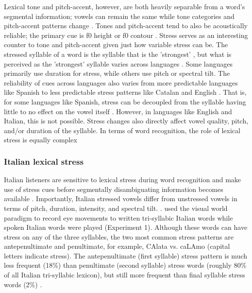 Lexical tone and pitch-accent, however, are both heavily separable from a word's segmental information; vowels can remain the same while tone categories and pitch-accent patterns change \citep{Zeng2017}. Tones and pitch-accent tend to also be acoustically reliable; the primary cue is f0 height or f0 contour \citep{goss_2014}.  Stress serves as an interesting counter to tone and pitch-accent given just how variable stress can be. The stressed syllable of a word is the syllable that is the 'strongest' \citep{sluijter1996spectral}, but what is perceived as the 'strongest' syllable varies across languages \citep{Cutler1988}. Some languages primarily use duration for stress, while others use pitch or spectral tilt. The reliability of cues across languages also varies from more predictable languages like Spanish to less predictable stress patterns like Catalan and English \citep{ortega_2011, beckman_1994}. That is, for some languages like Spanish, stress can be decoupled from the syllable having little to no effect on the vowel itself \citep{ortega_2011}. However, in languages like English and Italian, this is not possible. Stress changes also directly affect vowel quality, pitch, and/or duration of the syllable. In terms of word recognition, the role of lexical stress is equally complex \citep{cutler2001voornaam, Reinisch2010}

\subsubsection{Italian lexical stress}
Italian listeners are sensitive to lexical stress during word recognition and make use of stress cues before segmentally disambiguating information becomes available \citep{Tagliapietra2005, Sulpizio_McQueen_2012}. Importantly, Italian stressed vowels differ from unstressed vowels in terms of pitch, duration, intensity, and spectral tilt. \citep{Maturi1998}. \cite{Sulpizio_McQueen_2012} used the visual world paradigm to record eye movements to written tri-syllabic Italian words while spoken Italian words were played (Experiment 1). Although these words can have stress on any of the three syllables, the two most common stress patterns are antepenultimate and penultimate, for example, CAlata vs. caLAmo (capital letters indicate stress). The antepenultimate (first syllable) stress pattern is much less frequent (18\%) than penultimate (second syllable) stress words (roughly 80\% of all Italian tri-syllabic lexicon), but still more frequent than final syllable stress words (2\%) \citep{thornton_1997}. 

